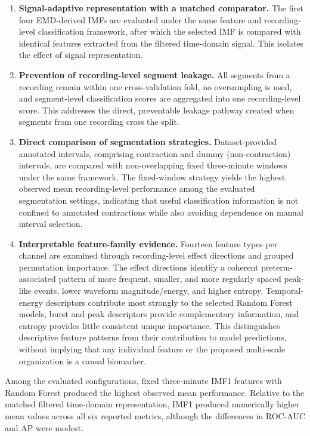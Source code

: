\documentclass[10pt,letterpaper]{article}
\begin{document}
\begin{enumerate}
    \item \textbf{Signal-adaptive representation with a matched comparator.}  
    The first four EMD-derived IMFs are evaluated under the same feature and recording-level classification framework, after which the selected IMF is compared with identical features extracted from the filtered time-domain signal. This isolates the effect of signal representation.

    \item \textbf{Prevention of recording-level segment leakage.}
    All segments from a recording remain within one cross-validation fold, no oversampling is used, and segment-level classification scores are aggregated into one recording-level score. This addresses the direct, preventable leakage pathway created when segments from one recording cross the split.

    \item \textbf{Direct comparison of segmentation strategies.}
    Dataset-provided annotated intervals, comprising contraction and dummy (non-contraction) intervals, are compared with non-overlapping fixed three-minute windows under the same framework. The fixed-window strategy yields the highest observed mean recording-level performance among the evaluated segmentation settings, indicating that useful classification information is not confined to annotated contractions while also avoiding dependence on manual interval selection.

    \item \textbf{Interpretable feature-family evidence.}
    Fourteen feature types per channel are examined through recording-level effect directions and grouped permutation importance. The effect directions identify a coherent preterm-associated pattern of more frequent, smaller, and more regularly spaced peak-like events, lower waveform magnitude/energy, and higher entropy. Temporal-energy descriptors contribute most strongly to the selected Random Forest models, burst and peak descriptors provide complementary information, and entropy provides little consistent unique importance. This distinguishes descriptive feature patterns from their contribution to model predictions, without implying that any individual feature or the proposed multi-scale organization is a causal biomarker.
    
\end{enumerate}

Among the evaluated configurations, fixed three-minute IMF1 features with Random Forest produced the highest observed mean performance. Relative to the matched filtered time-domain representation, IMF1 produced numerically higher mean values across all six reported metrics, although the differences in ROC-AUC and AP were modest.
\end{document}
